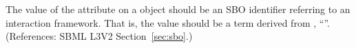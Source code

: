 The value of the attribute  on a \Reaction object should be
an SBO identifier referring to an interaction framework.  That is, the
value should be a term derived from \sbointeractionID, ``''.
(References: SBML L3V2 Section~\ref{sec:sbo}.)
